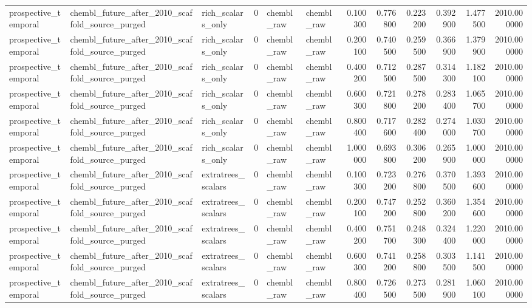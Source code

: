 \begin{longtable}{lllrllrrrrrr}
prospective\_temporal & chembl\_future\_after\_2010\_scaffold\_source\_purged & rich\_scalars\_only & 0 & chembl\_raw & chembl\_raw & 0.100300 & 0.776800 & 0.223200 & 0.392900 & 1.477500 & 2010.000000 \\
prospective\_temporal & chembl\_future\_after\_2010\_scaffold\_source\_purged & rich\_scalars\_only & 0 & chembl\_raw & chembl\_raw & 0.200100 & 0.740500 & 0.259500 & 0.366900 & 1.379900 & 2010.000000 \\
prospective\_temporal & chembl\_future\_after\_2010\_scaffold\_source\_purged & rich\_scalars\_only & 0 & chembl\_raw & chembl\_raw & 0.400200 & 0.712500 & 0.287500 & 0.314300 & 1.182100 & 2010.000000 \\
prospective\_temporal & chembl\_future\_after\_2010\_scaffold\_source\_purged & rich\_scalars\_only & 0 & chembl\_raw & chembl\_raw & 0.600300 & 0.721800 & 0.278200 & 0.283400 & 1.065700 & 2010.000000 \\
prospective\_temporal & chembl\_future\_after\_2010\_scaffold\_source\_purged & rich\_scalars\_only & 0 & chembl\_raw & chembl\_raw & 0.800400 & 0.717600 & 0.282400 & 0.274000 & 1.030700 & 2010.000000 \\
prospective\_temporal & chembl\_future\_after\_2010\_scaffold\_source\_purged & rich\_scalars\_only & 0 & chembl\_raw & chembl\_raw & 1.000000 & 0.693800 & 0.306200 & 0.265900 & 1.000000 & 2010.000000 \\
prospective\_temporal & chembl\_future\_after\_2010\_scaffold\_source\_purged & extratrees\_scalars & 0 & chembl\_raw & chembl\_raw & 0.100300 & 0.723200 & 0.276800 & 0.370500 & 1.393600 & 2010.000000 \\
prospective\_temporal & chembl\_future\_after\_2010\_scaffold\_source\_purged & extratrees\_scalars & 0 & chembl\_raw & chembl\_raw & 0.200100 & 0.747200 & 0.252800 & 0.360200 & 1.354600 & 2010.000000 \\
prospective\_temporal & chembl\_future\_after\_2010\_scaffold\_source\_purged & extratrees\_scalars & 0 & chembl\_raw & chembl\_raw & 0.400200 & 0.751700 & 0.248300 & 0.324400 & 1.220000 & 2010.000000 \\
prospective\_temporal & chembl\_future\_after\_2010\_scaffold\_source\_purged & extratrees\_scalars & 0 & chembl\_raw & chembl\_raw & 0.600300 & 0.741200 & 0.258800 & 0.303500 & 1.141500 & 2010.000000 \\
prospective\_temporal & chembl\_future\_after\_2010\_scaffold\_source\_purged & extratrees\_scalars & 0 & chembl\_raw & chembl\_raw & 0.800400 & 0.726500 & 0.273500 & 0.281900 & 1.060100 & 2010.000000 \\

\end{longtable}

